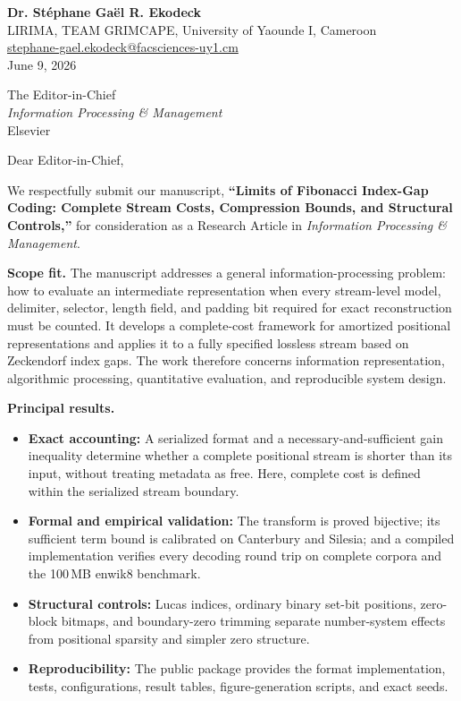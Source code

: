 \documentclass[10pt,a4paper]{article}
\newcommand{\lead}[1]{\textcolor{sectionblue}{\textbf{#1}}}
\begin{document}
\fontsize{9.75}{10.35}\selectfont
\justifying

\begin{flushright}
\textbf{\fontsize{10.5}{11}\selectfont Dr. St\'ephane Ga\"el R. Ekodeck}\\
LIRIMA, TEAM GRIMCAPE, University of Yaounde I, Cameroon\\
\href{mailto:stephane-gael.ekodeck@facsciences-uy1.cm}{stephane-gael.ekodeck@facsciences-uy1.cm}\\
June 9, 2026
\end{flushright}
\vspace{-1.5mm}

The Editor-in-Chief\\
\textit{Information Processing \& Management}\\
Elsevier

\vspace{1mm}
Dear Editor-in-Chief,

We respectfully submit our manuscript, \textbf{``Limits of Fibonacci
Index-Gap Coding: Complete Stream Costs, Compression Bounds, and Structural
Controls,''} for consideration as a Research Article
in \textit{Information Processing \& Management}.

\lead{Scope fit.} The manuscript addresses a general information-processing
problem: how to evaluate an intermediate representation when every stream-level model,
delimiter, selector, length field, and padding bit required for exact
reconstruction must be counted. It develops a complete-cost framework for
amortized positional representations and applies it to a fully specified
lossless stream based on Zeckendorf index gaps. The work therefore concerns
information representation, algorithmic processing, quantitative evaluation,
and reproducible system design.

\lead{Principal results.}
\begin{itemize}
  \item \textbf{Exact accounting:} A serialized format and a
  necessary-and-sufficient gain inequality determine whether a complete
  positional stream is shorter than its input, without treating metadata as
  free. Here, complete cost is defined within the serialized stream boundary.
  \item \textbf{Formal and empirical validation:} The transform is proved
  bijective; its sufficient term bound is calibrated on Canterbury and
  Silesia; and a compiled implementation verifies every decoding round trip
  on complete corpora and the 100\,MB enwik8 benchmark.
  \item \textbf{Structural controls:} Lucas indices, ordinary binary set-bit
  positions, zero-block bitmaps, and boundary-zero trimming separate
  number-system effects from positional sparsity and simpler zero structure.
  \item \textbf{Reproducibility:} The public package provides the format
  implementation, tests, configurations, result tables, figure-generation
  scripts, and exact seeds.
\end{itemize}
\end{document}
